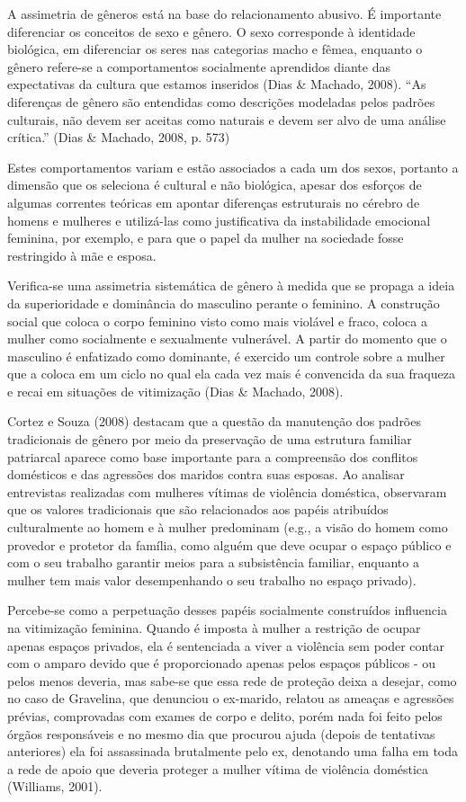 A assimetria de gêneros está na base do relacionamento abusivo. É importante diferenciar os conceitos de sexo e gênero. O sexo corresponde à identidade biológica, em diferenciar os seres nas categorias macho e fêmea, enquanto o gênero refere-se a comportamentos socialmente aprendidos diante das expectativas da cultura que estamos inseridos (Dias \& Machado, 2008). ``As diferenças de gênero são entendidas como descrições modeladas pelos padrões culturais, não devem ser aceitas como naturais e devem ser alvo de uma análise crítica.'' (Dias \& Machado, 2008, p. 573) 

Estes comportamentos variam e estão associados a cada um dos sexos, portanto a dimensão que os seleciona é cultural e não biológica, apesar dos esforços de algumas correntes teóricas em apontar diferenças estruturais no cérebro de homens e mulheres e utilizá-las como justificativa da instabilidade emocional feminina, por exemplo, e para que o papel da mulher na sociedade fosse restringido à mãe e esposa.

Verifica-se uma assimetria sistemática de gênero à medida que se propaga a ideia da superioridade e dominância do masculino perante o feminino. A construção social que coloca o corpo feminino visto como mais violável e fraco, coloca a mulher como socialmente e sexualmente vulnerável. A partir do momento que o masculino é enfatizado como dominante, é exercido um controle sobre a mulher que a coloca em um ciclo no qual ela cada vez mais é convencida da sua fraqueza e recai em situações de vitimização (Dias \& Machado, 2008).

Cortez e Souza (2008) destacam que a questão da manutenção dos padrões tradicionais de gênero por meio da preservação de uma estrutura familiar patriarcal aparece como base importante para a compreensão dos conflitos domésticos e das agressões dos maridos contra suas esposas. Ao analisar entrevistas realizadas com mulheres vítimas de violência doméstica, observaram que os valores tradicionais que são relacionados aos papéis atribuídos culturalmente ao homem e à mulher predominam (e.g., a visão do homem como provedor e protetor da família, como alguém que deve ocupar o espaço público e com o seu trabalho garantir meios para a subsistência familiar, enquanto a mulher tem mais valor desempenhando o seu trabalho no espaço privado).

Percebe-se como a perpetuação desses papéis socialmente construídos influencia na vitimização feminina. Quando é imposta à mulher a restrição de ocupar apenas espaços privados, ela é sentenciada a viver a violência sem poder contar com o amparo devido que é proporcionado apenas pelos espaços públicos - ou pelos menos deveria, mas sabe-se que essa rede de proteção deixa a desejar, como no caso de Gravelina, que denunciou o ex-marido, relatou as ameaças e agressões prévias, comprovadas com exames de corpo e delito, porém nada foi feito pelos órgãos responsáveis e no mesmo dia que procurou ajuda (depois de tentativas anteriores) ela foi assassinada brutalmente pelo ex, denotando uma falha em toda a rede de apoio que deveria proteger a mulher vítima de violência doméstica (Williams, 2001).

